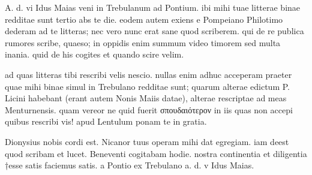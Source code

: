 


 A. d. vi Idus Maias veni in Trebulanum ad Pontium. ibi mihi tuae litterae binae redditae sunt tertio abs te die. eodem autem exiens e Pompeiano Philotimo dederam ad te litteras; nec vero nunc erat sane quod scriberem. qui de re publica rumores scribe, quaeso; in oppidis enim summum video timorem sed multa inania. quid de his cogites et quando scire velim.

 ad quas litteras tibi rescribi velis nescio. nullas enim adhuc acceperam praeter quae mihi binae simul in Trebulano redditae sunt; quarum alterae edictum P. Licini habebant (erant autem Nonis Maiis datae), alterae rescriptae ad meas Menturnensis. quam vereor ne quid fuerit σπουδαιότερον in iis quas non accepi quibus rescribi vis! apud Lentulum ponam te in gratia.

 Dionysius nobis cordi est. Nicanor tuus operam mihi dat egregiam. iam deest quod scribam et lucet. Beneventi cogitabam hodie. nostra continentia et diligentia †esse satis faciemus satis. a Pontio ex Trebulano a. d. v Idus Maias.
